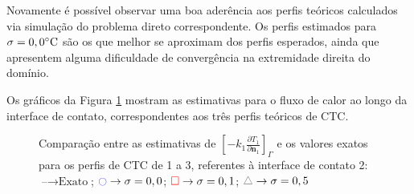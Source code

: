 Novamente é possível observar uma boa aderência aos perfis teóricos calculados via simulação do problema direto correspondente. Os perfis estimados para $\sigma = 0,0\celsius$ são os que melhor se aproximam dos perfis esperados, ainda que apresentem alguma dificuldade de convergência na extremidade direita do domínio.

Os gráficos da Figura \ref{figura_fluxo_calor_interface_02} mostram as estimativas para o fluxo de calor ao longo da interface de contato, correspondentes aos três perfis teóricos de CTC.

%
%
\begin{figure}[H]
	\caption{Comparação entre as estimativas de $\left[-k_1 \frac{\partial T_1}{\partial\mathbf{n}_1}\right]_\Gamma$ e os valores exatos para os perfis de CTC de 1 a 3, referentes à interface de contato 2: $\text{--} \rightarrow \text{Exato}$; $\textcolor{blue}{\ocircle} \rightarrow \sigma = 0,0$; $\textcolor{red}{\square} \rightarrow \sigma = 0,1$; $\textcolor{gray}{\triangle} \rightarrow \sigma = 0,5$}
	\label{figura_fluxo_calor_interface_02}
\end{figure}

